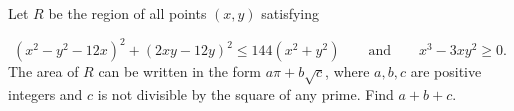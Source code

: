 Let \(R\) be the region of all points \((x,y)\) satisfying

\[
(x^2-y^2-12x)^2+(2xy-12y)^2\le 144(x^2+y^2) \qquad \text{and}\qquad x^3-3xy^2\ge 0.
\]The area of \(R\) can be written in the form \(a\pi+b\sqrt{c}\), where \(a,b,c\) are positive integers and \(c\) is not divisible by the square of any prime. Find \(a+b+c\).
